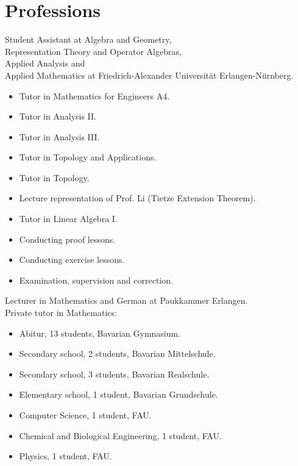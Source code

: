 \documentclass[a4paper, 11pt]{article}
\newcommand{\years}[1]{\marginnote{\scriptsize #1}}
\begin{document}
	\section*{Professions}
	\years{2023--25} Student Assistant at Algebra and Geometry, \\ Representation
	Theory and Operator Algebras, \\ Applied Analysis and \\ Applied Mathematics at
	Friedrich-Alexander Universität Erlangen-Nürnberg.
	\begin{itemize}
		\item Tutor in \glqq Mathematics for Engineers A4\grqq.

		\item Tutor in \glqq Analysis II\grqq.

		\item Tutor in \glqq Analysis III\grqq.

		\item Tutor in \glqq Topology and Applications\grqq.

		\item Tutor in \glqq Topology\grqq.

		\item Lecture representation of Prof. Li (Tietze Extension Theorem).

		\item Tutor in \glqq Linear Algebra I\grqq.

		\item Conducting proof lessons.

		\item Conducting exercise lessons.

		\item Examination, supervision and correction.
	\end{itemize}
	\years{2025} Lecturer in Mathematics and German at Paukkammer Erlangen.\\ \years{2024--25}
	Private tutor in Mathematics:
	\begin{itemize}
		\item Abitur, 13 students, Bavarian Gymnasium.

		\item Secondary school, 2 students, Bavarian Mittelschule.

		\item Secondary school, 3 students, Bavarian Realschule.

		\item Elementary school, 1 student, Bavarian Grundschule.

		\item Computer Science, 1 student, FAU.

		\item Chemical and Biological Engineering, 1 student, FAU.

		\item Physics, 1 student, FAU.
	\end{itemize}
\end{document}
